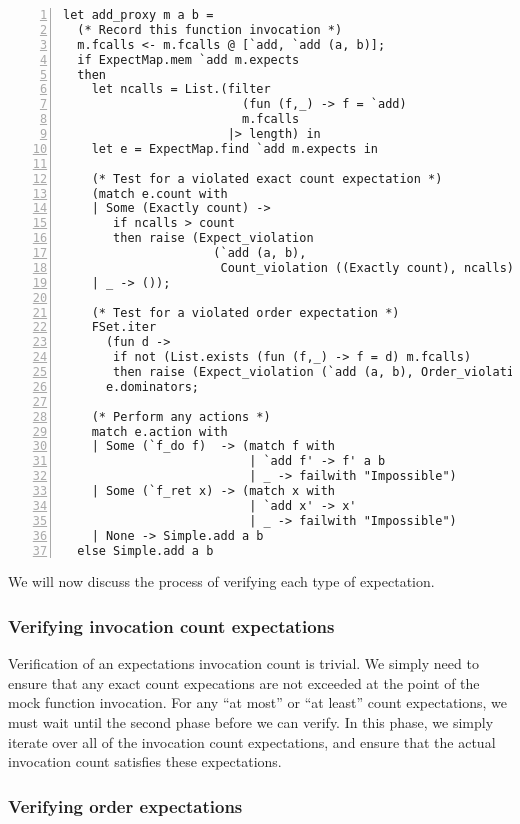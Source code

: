 \begin{lstlisting}[aboveskip=\baselineskip,
    caption=A proxy for a mocked function,
    numbers=left,
    label=code:simple_mock_add_proxy]
let add_proxy m a b =
  (* Record this function invocation *)
  m.fcalls <- m.fcalls @ [`add, `add (a, b)];
  if ExpectMap.mem `add m.expects
  then
    let ncalls = List.(filter
                         (fun (f,_) -> f = `add)
                         m.fcalls
                       |> length) in
    let e = ExpectMap.find `add m.expects in

    (* Test for a violated exact count expectation *)
    (match e.count with
    | Some (Exactly count) ->
       if ncalls > count
       then raise (Expect_violation
                     (`add (a, b),
                      Count_violation ((Exactly count), ncalls)));
    | _ -> ());

    (* Test for a violated order expectation *)
    FSet.iter
      (fun d ->
       if not (List.exists (fun (f,_) -> f = d) m.fcalls)
       then raise (Expect_violation (`add (a, b), Order_violation d)))
      e.dominators;

    (* Perform any actions *)
    match e.action with
    | Some (`f_do f)  -> (match f with
                          | `add f' -> f' a b
                          | _ -> failwith "Impossible")
    | Some (`f_ret x) -> (match x with
                          | `add x' -> x'
                          | _ -> failwith "Impossible")
    | None -> Simple.add a b
  else Simple.add a b
\end{lstlisting}

We will now discuss the process of verifying each type of expectation.

\subsubsection{Verifying invocation count expectations}

Verification of an expectations invocation count is trivial. We simply
need to ensure that any exact count expecations are not exceeded at
the point of the mock function invocation. For any ``at most'' or ``at
least'' count expectations, we must wait until the second phase before
we can verify. In this phase, we simply iterate over all of the
invocation count expectations, and ensure that the actual invocation
count satisfies these expectations.

\subsubsection{Verifying order expectations}

